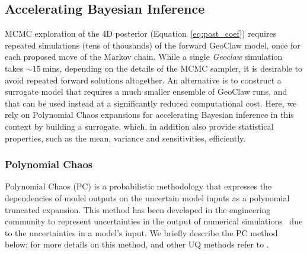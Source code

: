 \subsection{Accelerating Bayesian Inference}
\label{sec:uqpce}


MCMC exploration of the 4D posterior (Equation~\ref{eq:post_coef}) requires repeated simulations (tens of thousands) of the forward GeoClaw model, once for each proposed move of the Markov chain. While a single \emph{Geoclaw} simulation
takes $\sim 15~$mins, depending on the details of the MCMC sampler, it is desirable to avoid repeated forward solutions altogether. An alternative is to construct a surrogate model that requires a much
smaller ensemble of GeoClaw runs, and that can be used instead
at a significantly reduced computational cost.  Here, we rely on
Polynomial Chaos expansions for accelerating Bayesian inference in this context 
by building a surrogate, which, in addition
also provide statistical properties,  such as the mean, variance and sensitivities,
efficiently. 

\subsubsection{Polynomial Chaos}

Polynomial Chaos (PC) is a probabilistic methodology that expresses the 
dependencies of model outputs on the uncertain model inputs
as a polynomial truncated expansion. This method has been developed in 
the engineering community to represent uncertainties in the output of 
numerical simulations~\citep{Villegas2012,Lin2009,Xiu2004}
due to the uncertainties in a model's input. We briefly describe the PC
method below; for more details on this method, and other UQ methods
refer to \citep{LeMaitreKnio2010}.

